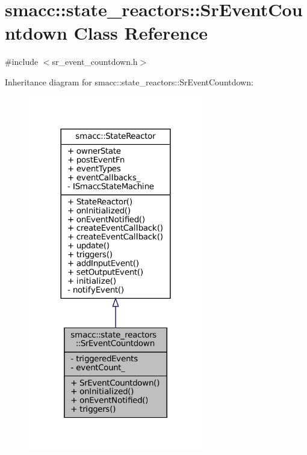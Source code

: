 \hypertarget{classsmacc_1_1state__reactors_1_1SrEventCountdown}{}\section{smacc\+:\+:state\+\_\+reactors\+:\+:Sr\+Event\+Countdown Class Reference}
\label{classsmacc_1_1state__reactors_1_1SrEventCountdown}


{\ttfamily \#include $<$sr\+\_\+event\+\_\+countdown.\+h$>$}



Inheritance diagram for smacc\+:\+:state\+\_\+reactors\+:\+:Sr\+Event\+Countdown\+:
\nopagebreak
\begin{figure}[H]
\begin{center}
\leavevmode
\includegraphics[width=216pt]{classsmacc_1_1state__reactors_1_1SrEventCountdown__inherit__graph}
\end{center}
\end{figure}



